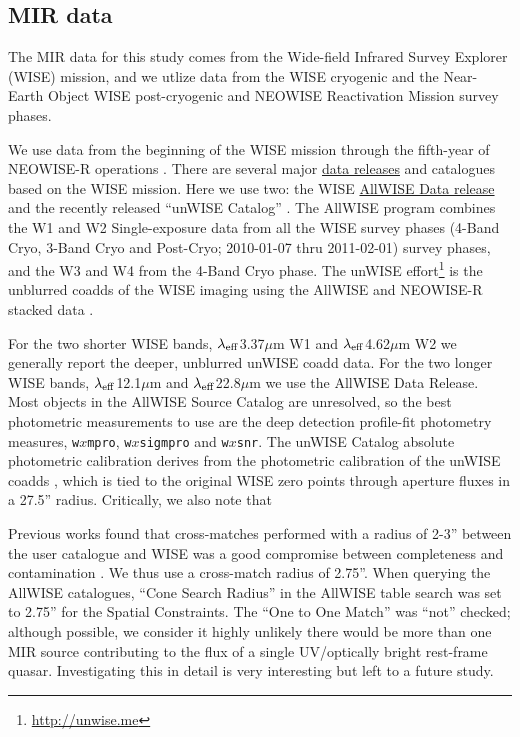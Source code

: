 \documentclass[usenatbib]{mnras}
\begin{document}
\subsection{MIR data}
The MIR data for this study comes from the Wide-field Infrared Survey Explorer (WISE) mission, and we utlize data from the WISE cryogenic and the Near-Earth Object WISE \citep[NEOWISE; ][]{Mainzer2011} post-cryogenic and NEOWISE Reactivation Mission \citep[NEOWISE-R][]{Mainzer2014} survey phases.

We use data from the beginning of the WISE mission \citep[2010 January; ][]{Wright2010} through the fifth-year of NEOWISE-R operations \citep[2018 December;]{Mainzer2011}.  There are several  major \href{https://irsa.ipac.caltech.edu/Missions/wise.html}{data releases} and catalogues based on the WISE mission. Here we use two: the WISE \href{http://wise2.ipac.caltech.edu/docs/release/allwise/}{AllWISE Data release} and the recently released ``unWISE Catalog'' \citet{Schlafly2019}. The AllWISE program combines the W1 and W2 Single-exposure data from all the WISE survey phases (4-Band Cryo, 3-Band Cryo and Post-Cryo; 2010-01-07 thru 2011-02-01) survey phases, and the W3 and W4 from the 4-Band Cryo phase. The unWISE effort\footnote{\href{http://unwise.me}{http://unwise.me}} is the unblurred coadds of the WISE imaging using the AllWISE and NEOWISE-R stacked data \citep{Lang2014, Meisner2018a, Meisner2018b}.

For the two shorter WISE bands, $\lambda_{\rm eff}$3.37$\mu$m W1 and $\lambda_{\rm eff}$4.62$\mu$m W2 we generally report the deeper, unblurred unWISE coadd data.  For the two longer WISE bands, $\lambda_{\rm eff}$12.1$\mu$m and $\lambda_{\rm eff}$22.8$\mu$m we use the AllWISE Data Release.  Most objects in the AllWISE Source Catalog are unresolved, so the best photometric measurements to use are the deep detection profile-fit photometry measures,  {\tt w$x$mpro},  {\tt w$x$sigmpro} and  {\tt w$x$snr}. The unWISE Catalog absolute photometric calibration derives from the photometric calibration of the unWISE coadds \citep{Meisner2017a}, which is tied to the original WISE zero points through aperture fluxes in a 27.5'' radius. Critically, we also note that 

Previous works \citep[e.g., ][]{Krawczyk2013, Ross2015, Bilicki2016} found that cross-matches performed with a radius of 2-3'' between the user catalogue and WISE was a good compromise between completeness and contamination \citep[see e.g. Figure 4 of ][]{Krawczyk2013}. We thus use a cross-match radius of 2.75''. When querying the AllWISE catalogues, ``Cone Search Radius'' in the AllWISE table search was set to 2.75'' for the Spatial Constraints. The ``One to One Match'' was ``not'' checked; although possible, we consider it highly unlikely there would be more than one MIR source contributing to the flux of a single UV/optically bright rest-frame quasar. Investigating this in detail is very interesting but left to a future study. 
\end{document}
